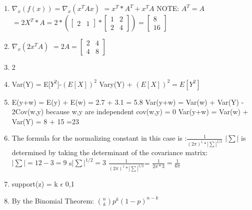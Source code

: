 \documentclass{article}
\begin{document}
\begin{enumerate}
		\item $\nabla_{x}(f(x)) = \nabla_{x}(x^{T}Ax)$ \newline
		$= x^{T}*A^{T} + x^{T}A$ \newline
		NOTE: $A^{T} = A$ \newline
		$= 2X^{T}*A = 2*(\begin{bmatrix}
		2 & 1
		\end{bmatrix} * \begin{bmatrix} 1 & 2 \\ 2 & 4 \end{bmatrix}) = \begin{bmatrix}
		 8 \\ 16
		\end{bmatrix}$
		
		\item $\nabla_{x}(2x^{T}A)$ \newline
		$= 2A = \begin{bmatrix}
		2 & 4 \\ 4 & 8
		\end{bmatrix} $
		
		\item 2
		
		\item Var(Y) = E[$Y^{2}$]-$(E[X])^{2}$ \newline
		Vary(Y) + $(E[X])^{2}=E[Y^{2}]$
		
		\item E(y+w) = E(y) + E(w) = 2.7 + 3.1 = 5.8 \newline
		Var(y+w) = Var(w) + Var(Y) - 2Cov(w,y) \newline
		because w,y are independent cov(w,y) = 0 \newline
		Var(y+w) = Var(w) + Var(Y) = 8 + 15 =23
		
		\item The formula for the normalizing constant in this case is :$\frac{1}{(2\pi)^{1}*|\sum|^{1/2}}$ \newline $|\sum|$ is determined by taking the determinant of the covariance matrix: $|\sum|= 12-3=9$  \newline s$ |\sum|^{1/2}=3$ \newline
		$\frac{1}{(2\pi)^{1}*|\sum|^{1/2}}$= $\frac{1}{2\pi*3} = \frac{1}{6\pi}$
		
		\item support(z) = k $\epsilon$ {0,1}
		
		\item By the Binomial Theorem: $\binom{n}{k}p^{k}(1-p)^{n-k}$
		

\end{enumerate}
\end{document}
